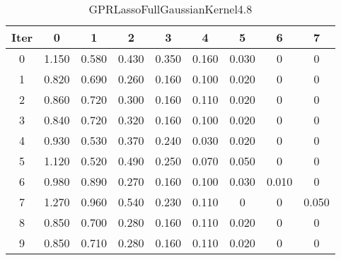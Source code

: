 \begin{table}
	\begin{center}
		\begin{tabular}{|c|c|c|c|c|c|c|c|c|}
			\hline
			Iter & 0 & 1 & 2 & 3 & 4 & 5 & 6 & 7 \\
			\hline
			0 & 1.150 & 0.580 & 0.430 & 0.350 & 0.160 & 0.030 & 0 & 0 \\
			\hline
			1 & 0.820 & 0.690 & 0.260 & 0.160 & 0.100 & 0.020 & 0 & 0 \\
			\hline
			2 & 0.860 & 0.720 & 0.300 & 0.160 & 0.110 & 0.020 & 0 & 0 \\
			\hline
			3 & 0.840 & 0.720 & 0.320 & 0.160 & 0.100 & 0.020 & 0 & 0 \\
			\hline
			4 & 0.930 & 0.530 & 0.370 & 0.240 & 0.030 & 0.020 & 0 & 0 \\
			\hline
			5 & 1.120 & 0.520 & 0.490 & 0.250 & 0.070 & 0.050 & 0 & 0 \\
			\hline
			6 & 0.980 & 0.890 & 0.270 & 0.160 & 0.100 & 0.030 & 0.010 & 0 \\
			\hline
			7 & 1.270 & 0.960 & 0.540 & 0.230 & 0.110 & 0 & 0 & 0.050 \\
			\hline
			8 & 0.850 & 0.700 & 0.280 & 0.160 & 0.110 & 0.020 & 0 & 0 \\
			\hline
			9 & 0.850 & 0.710 & 0.280 & 0.160 & 0.110 & 0.020 & 0 & 0 \\
			\hline
		\end{tabular}
	\end{center}
	\caption{GPRLassoFullGaussianKernel4.8}
\end{table}